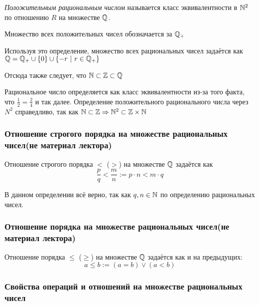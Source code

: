 \begin{definition}
    \textit{Положительным рациональным числом} называется класс эквивалентности в $\mathbb{N}^2$ по отношению $R$ на множестве $\mathbb{Q}$.
\end{definition}
    
Множество всех положительных чисел обозначается за $\mathbb{Q}_+$
    
Используя это определение, множество всех рациональных чисел задаётся как $\mathbb{Q} = \mathbb{Q}_+ \cup \{0\} \cup \{-r\ |\ r \in \mathbb{Q}_+\}$
    
Отсюда также следует, что $\mathbb{N} \subset \mathbb{Z} \subset \mathbb{Q}$ 

\begin{anote}
    Рациональное число определяется как класс эквивалентности из-за того факта, что $\frac{1}{2} = \frac{2}{4}$ и так далее. Определение положительного рационального числа через $N^2$ справедливо, так как $\mathbb{N} \subset \mathbb{Z} \Rightarrow \mathbb{N}^2 \subset \mathbb{Z} \times \mathbb{N}$
\end{anote}

\subsubsection*{Отношение строгого порядка на множестве рациональных чисел(не материал лектора)}

\begin{definition}
    Отношение строгого порядка $<$ ($>$) на множестве $\mathbb{Q}$ задаётся как
    $$
        \frac{p}{q} < \frac{m}{n} := p \cdot n < m \cdot q
    $$
\end{definition}

\begin{anote}
    В данном определении всё верно, так как $q, n \in \mathbb{N}$ по определению рациональных чисел.
\end{anote}

\subsubsection*{Отношение порядка на множестве рациональных чисел(не материал лектора)}

\begin{definition}
    Отношение порядка $\le$ ($\ge$) на множестве $\mathbb{Q}$ задаётся как и на предыдущих:
    $$
        a \le b := (a = b) \vee (a < b)
    $$
\end{definition}

\subsubsection{Свойства операций и отношений на множестве рациональных чисел}

